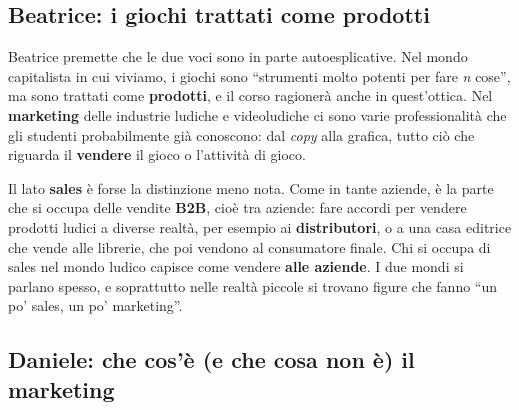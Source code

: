 \subsection{Beatrice: i giochi trattati come prodotti}

Beatrice premette che le due voci sono in parte autoesplicative. Nel mondo
capitalista in cui viviamo, i giochi sono ``strumenti molto potenti per fare
\emph{n} cose'', ma sono trattati come \textbf{prodotti}, e il corso ragionerà
anche in quest'ottica. Nel \textbf{marketing} delle industrie ludiche e
videoludiche ci sono varie professionalità che gli studenti probabilmente già
conoscono: dal \emph{copy} alla grafica, tutto ciò che riguarda il
\textbf{vendere} il gioco o l'attività di gioco.

Il lato \textbf{sales} è forse la distinzione meno nota. Come in tante aziende, è
la parte che si occupa delle vendite \textbf{B2B}, cioè tra aziende: fare
accordi per vendere prodotti ludici a diverse realtà, per esempio ai
\textbf{distributori}, o a una casa editrice che vende alle librerie, che poi
vendono al consumatore finale. Chi si occupa di sales nel mondo ludico capisce
come vendere \textbf{alle aziende}. I due mondi si parlano spesso, e soprattutto
nelle realtà piccole si trovano figure che fanno ``un po' sales, un po'
marketing''.

\subsection{Daniele: che cos'è (e che cosa non è) il marketing}

